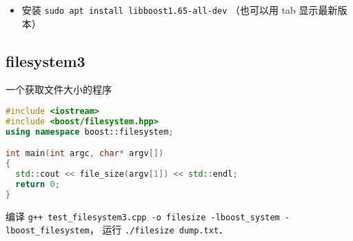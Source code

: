
\begin{itemize}
\item 安装 \verb|sudo apt install libboost1.65-all-dev| （也可以用 tab 显示最新版本）
\end{itemize}

\subsection{filesystem3}
一个获取文件大小的程序
\begin{lstlisting}[language=cpp]
#include <iostream>
#include <boost/filesystem.hpp>
using namespace boost::filesystem;

int main(int argc, char* argv[])
{
  std::cout << file_size(argv[1]) << std::endl;
  return 0;
}
\end{lstlisting}

编译 \verb|g++ test_filesystem3.cpp -o filesize -lboost_system -lboost_filesystem|， 运行 \verb|./filesize dump.txt|．